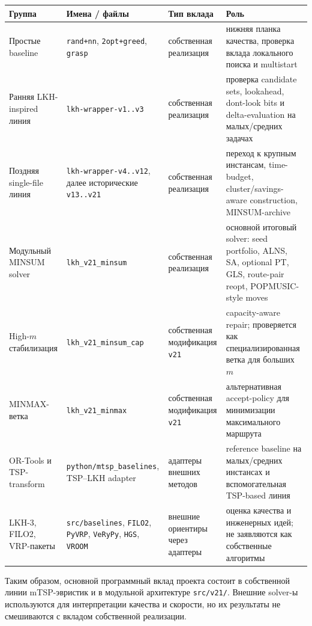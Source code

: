 \documentclass[14pt,a4paper]{extarticle}
\begin{document}
{\scriptsize\setlength{\tabcolsep}{2pt}
\begin{longtable}{>{\raggedright\arraybackslash}p{}>{\raggedright\arraybackslash}p{}>{\raggedright\arraybackslash}p{}>{\raggedright\arraybackslash}p{}}
\toprule
\textbf{Группа} & \textbf{Имена / файлы} & \textbf{Тип вклада} & \textbf{Роль}\\
\midrule
\endhead
Простые baseline & \texttt{rand+nn}, \texttt{2opt+greed}, \texttt{grasp} & собственная реализация & нижняя планка качества, проверка вклада локального поиска и multistart\\
Ранняя LKH-inspired линия & \texttt{lkh-wrapper-v1..v3} & собственная реализация & проверка candidate sets, lookahead, dont-look bits и delta-evaluation на малых/средних задачах\\
Поздняя single-file линия & \texttt{lkh-wrapper-v4..v12}, далее исторические \texttt{v13..v21} & собственная реализация & переход к крупным инстансам, time-budget, cluster/savings-aware construction, MINSUM-archive\\
Модульный MINSUM solver & \texttt{lkh\_v21\_minsum} & собственная реализация & основной итоговый solver: seed portfolio, ALNS, SA, optional PT, GLS, route-pair reopt, POPMUSIC-style moves\\
High-$m$ стабилизация & \texttt{lkh\_v21\_minsum\_cap} & собственная модификация \texttt{v21} & capacity-aware repair; проверяется как специализированная ветка для больших $m$\\
MINMAX-ветка & \texttt{lkh\_v21\_minmax} & собственная модификация \texttt{v21} & альтернативная accept-policy для минимизации максимального маршрута\\
OR-Tools и TSP-transform & \texttt{python/mtsp\_baselines}, TSP--LKH adapter & адаптеры внешних методов & reference baseline на малых/средних инстансах и вспомогательная TSP-based линия\\
LKH-3, FILO2, VRP-пакеты & \texttt{src/baselines}, \texttt{FILO2}, \texttt{PyVRP}, \texttt{VeRyPy}, \texttt{HGS}, \texttt{VROOM} & внешние ориентиры через адаптеры & оценка качества и инженерных идей; не заявляются как собственные алгоритмы\\
\bottomrule
\end{longtable}
}

Таким образом, основной программный вклад проекта состоит в собственной линии mTSP-эвристик и в модульной архитектуре \texttt{src/v21/}. Внешние solver-ы используются для интерпретации качества и скорости, но их результаты не смешиваются с вкладом собственной реализации.
\end{document}
